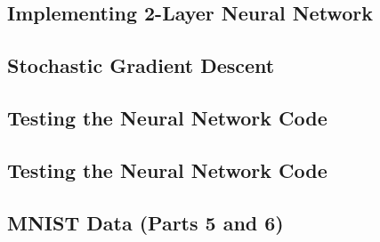\documentclass[10pt]{article}
\begin{document}
\subsection*{Implementing 2-Layer Neural Network}

\subsection*{Stochastic Gradient Descent}

\subsection*{Testing the Neural Network Code}

\subsection*{Testing the Neural Network Code}

\subsection*{MNIST Data (Parts 5 and 6)}
\end{document}
